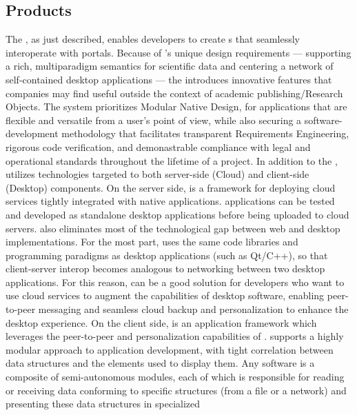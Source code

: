 \documentclass[10pt,letterpaper]{article}
\begin{document}
\subsection{{\lMOSAIC} Products}
The {\MOSAIC} {\SDK}, as just described, enables 
developers to create {\RO}s that 
seamlessly interoperate with {\MOSAIC} 
portals.  Because of {\MOSAIC}'s unique design 
requirements --- supporting a 
rich, multiparadigm semantics for scientific data 
and centering a network of self-contained 
desktop applications --- the {\MOSAIC} {\SDK} 
introduces innovative features that companies may 
find useful outside the context of academic 
publishing/Research Objects.  
The {\MOSAIC} system  
prioritizes Modular Native Design, for applications 
that are flexible and versatile 
from a user's point of view, 
while also securing a software-development methodology 
that facilitates transparent Requirements 
Engineering, rigorous code verification, 
and demonastrable compliance with 
legal and operational standards throughout the 
lifetime of a project.
\p{}
In addition to the {\SDK}, {\MOSAIC} utilizes technologies 
targeted to both server-side (Cloud) 
and client-side (Desktop) components.  On the 
server side, {\NDPCloud} is a framework for deploying 
cloud services tightly integrated with native applications.  
{\NDPCloud} applications can be tested and 
developed as standalone desktop applications before 
being uploaded to cloud servers.  
{\NDPCloud} also eliminates most of the technological 
gap between web and desktop implementations.  
For the most part, {\NDPCloud} uses the same code libraries 
and programming paradigms as 
desktop applications (such as Qt/C++), 
so that client-server interop 
becomes analogous to networking between two 
desktop applications.  For this reason, {\NDPCloud} 
can be a good solution for developers who want to 
use cloud services to augment the capabilities 
of desktop software, enabling peer-to-peer 
messaging and seamless cloud backup and 
personalization to enhance the desktop experience.
\p{}
On the client side, {\VersatileUX} is an {\GUI} 
application framework which leverages 
the peer-to-peer and personalization 
capabilities of {\NDPCloud}.  {\VersatileUX} 
supports a highly modular approach to 
application development, with tight 
correlation between data structures and the {\GUI} 
elements used to display them.  Any {\VersatileUX} 
software is a composite of semi-autonomous  
modules, each of which is responsible for 
reading or receiving data conforming 
to specific structures (from a file or a network) 
and presenting these data structures in specialized 
\end{document}
